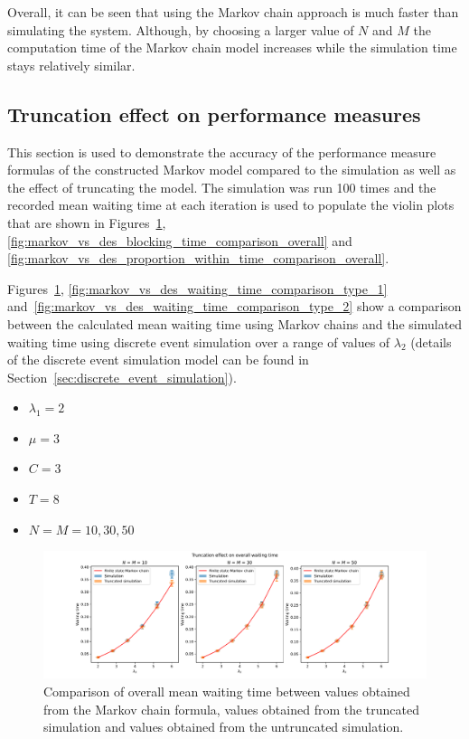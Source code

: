 Overall, it can be seen that using the Markov chain approach is much faster than
simulating the system.
Although, by choosing a larger value of \(N\) and \(M\) the computation time of
the Markov chain model increases while the simulation time stays relatively
similar.

\subsection{Truncation effect on performance measures}

This section is used to demonstrate the accuracy of the performance measure
formulas of the constructed Markov model compared to the simulation as well as
the effect of truncating the model.
The simulation was run 100 times and the recorded mean waiting time at each
iteration is used to populate the violin plots that are shown in
Figures~\ref{fig:markov_vs_des_waiting_time_comparison_overall},
\ref{fig:markov_vs_des_blocking_time_comparison_overall} and
\ref{fig:markov_vs_des_proportion_within_time_comparison_overall}.

Figures~\ref{fig:markov_vs_des_waiting_time_comparison_overall},
\ref{fig:markov_vs_des_waiting_time_comparison_type_1}
and~\ref{fig:markov_vs_des_waiting_time_comparison_type_2} show a
comparison between the calculated mean waiting time using Markov chains and the
simulated waiting time using discrete event simulation over a range of values of
\(\lambda_2\) (details of the discrete event simulation model can be found in
Section~\ref{sec:discrete_event_simulation}).

\begin{itemize}
    \item \(\lambda_1 = 2\)
    \item \(\mu = 3\)
    \item \(C = 3\)
    \item \(T = 8\)
    \item \(N = M = 10, 30, 50\)
\end{itemize}

\begin{figure}[H]
    \includegraphics[width=\textwidth]{chapters/03_queueing_model/img/numeric_results_and_timings/truncation_effect/waiting_time_overall.pdf}
    \caption{
        Comparison of overall mean waiting time between values obtained from the
        Markov chain formula, values obtained from the truncated simulation and
        values obtained from the untruncated simulation.
    }
    \label{fig:markov_vs_des_waiting_time_comparison_overall}
\end{figure}

